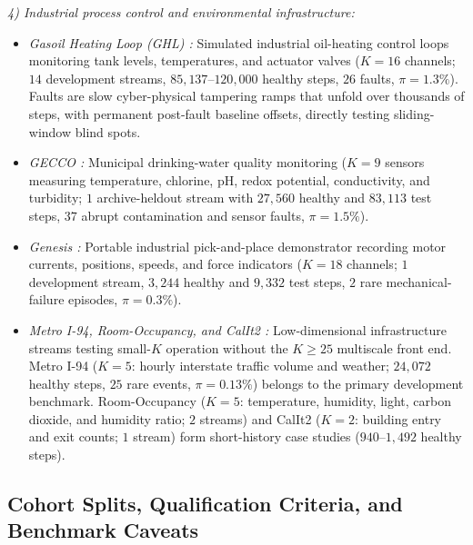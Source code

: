 \noindent\emph{4) Industrial process control and environmental infrastructure:}
\begin{itemize}[leftmargin=*, nosep, itemsep=1.5pt]
    \item \emph{Gasoil Heating Loop (GHL) \cite{schmidl2022anomaly}:} Simulated industrial oil-heating control loops monitoring tank levels, temperatures, and actuator valves ($K{=}16$ channels; $14$ development streams, $85{,}137\text{--}120{,}000$ healthy steps, $26$ faults, $\pi{=}1.3\%$). Faults are slow cyber-physical tampering ramps that unfold over thousands of steps, with permanent post-fault baseline offsets, directly testing sliding-window blind spots.
    \item \emph{GECCO \cite{schmidl2022anomaly}:} Municipal drinking-water quality monitoring ($K{=}9$ sensors measuring temperature, chlorine, pH, redox potential, conductivity, and turbidity; $1$ archive-heldout stream with $27{,}560$ healthy and $83{,}113$ test steps, $37$ abrupt contamination and sensor faults, $\pi{=}1.5\%$).
    \item \emph{Genesis \cite{schmidl2022anomaly}:} Portable industrial pick-and-place demonstrator recording motor currents, positions, speeds, and force indicators ($K{=}18$ channels; $1$ development stream, $3{,}244$ healthy and $9{,}332$ test steps, $2$ rare mechanical-failure episodes, $\pi{=}0.3\%$).
    \item \emph{Metro I-94, Room-Occupancy, and CalIt2 \cite{candanedo2016accurate, asuncion2007uci, schmidl2022anomaly}:} Low-dimensional infrastructure streams testing small-$K$ operation without the $K{\ge}25$ multiscale front end. Metro I-94 ($K{=}5$: hourly interstate traffic volume and weather; $24{,}072$ healthy steps, $25$ rare events, $\pi{=}0.13\%$) belongs to the primary development benchmark. Room-Occupancy ($K{=}5$: temperature, humidity, light, carbon dioxide, and humidity ratio; $2$ streams) and CalIt2 ($K{=}2$: building entry and exit counts; $1$ stream) form short-history case studies ($940\text{--}1{,}492$ healthy steps).
\end{itemize}

\subsection{Cohort Splits, Qualification Criteria, and Benchmark Caveats}
\label{subsec:cohort_caveats}

